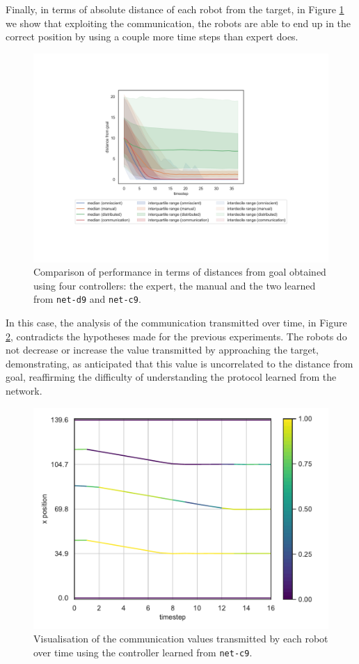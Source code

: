 Finally, in terms of absolute distance of each robot from the target, in Figure 
\ref{fig:net-c9distance} we show that exploiting the communication, the robots 
are able to end up in the correct position by using a couple more time steps than 
expert does. 
\begin{figure}[!htb]
	\centering
	\includegraphics[width=.65\textwidth]{contents/images/net-c9/distances-from-goal-compressed-communication}%
	\caption[Evaluation of \texttt{net-c9} distances from goal.]{Comparison of 
		performance in terms of distances from goal obtained using four controllers: 
		the expert, the manual and the two learned from \texttt{net-d9} and 
		\texttt{net-c9}.}
	\label{fig:net-c9distance}
\end{figure}

In this case, the analysis of the communication transmitted over time, in Figure 
\ref{fig:net-c9comm}, contradicts the hypotheses made for the previous 
experiments. The robots do not decrease or increase the value transmitted by 
approaching the target, demonstrating, as anticipated that this value is 
uncorrelated to the distance from goal, reaffirming the difficulty of understanding 
the protocol learned from the network.
\begin{figure}[!htb]
	\centering
	\includegraphics[width=.65\textwidth]{contents/images/net-c9/1/plot-simulation-communication-1}
	\vspace{-0.5cm}
	\caption[Evaluation of the communication learned by 
	\texttt{net-c9}.]{Visualisation of the communication values transmitted by each 
		robot over time using the controller learned from \texttt{net-c9}.}	
	\label{fig:net-c9comm}
\end{figure}


